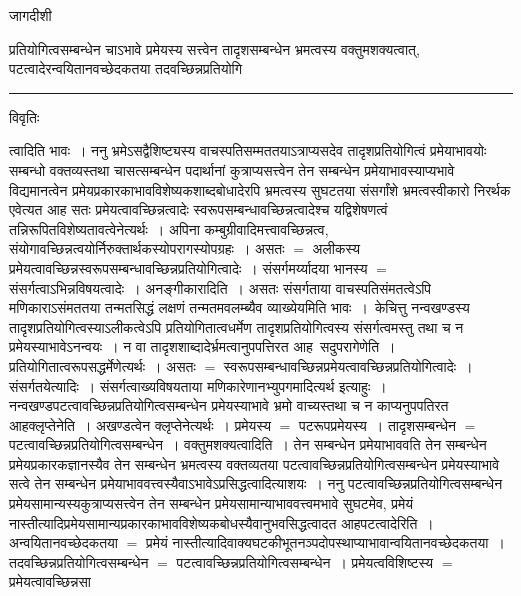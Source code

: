 \documentclass[10pt, openany]{book}
\begin{document}
{\newpage
\begin{center} जागदीशी \end{center}
{\la प्रतियोगित्वसम्बन्धेन चाऽभावे प्रमेयस्य सत्त्वेन तादृशसम्बन्धेन भ्रमत्वस्य वक्तुमशक्यत्वात्, पटत्वादेरन्वयितानवच्छेदकतया तदवच्छिन्नप्रतियोगि\textendash}\\
\hrule
\begin{center}     विवृतिः \end{center}
त्वादिति भावः~। ननु भ्रमेऽसद्वैशिष्ट्यस्य वाचस्पतिसम्मततयाऽत्राप्यसदेव तादृशप्रतियोगित्वं प्रमेयाभावयोः सम्बन्धो वक्तव्यस्तथा चासत्सम्बन्धेन पदार्थानां कुत्राप्यसत्त्वेन तेन सम्बन्धेन प्रमेयाभावस्याप्यभावे विद्यमानत्वेन प्रमेयप्रकारकाभावविशेष्यकशाब्दबोधादेरपि भ्रमत्वस्य सुघटतया संसर्गांशे भ्रमत्वस्वीकारो निरर्थक एवेत्यत आह सतः प्रमेयत्वावच्छिन्नत्वादेः स्वरूपसम्बन्धावच्छिन्नत्वादेश्च यद्विशेषणत्वं तन्निरूपितविशेष्यतावत्वेनेत्यर्थः~। अपिना कम्बुग्रीवादिमत्त्वावच्छिन्नत्व,
संयोगावच्छिन्नत्वयोर्निरुक्तार्थकस्योपरागस्योपग्रहः~। असतः $=$ अलीकस्य प्रमेयत्वावच्छिन्नस्वरूपसम्बन्धावच्छिन्नप्रतियोगित्वादेः~। संसर्गमर्य्यादया भानस्य $=$ संसर्गत्वाऽभिन्नविषयत्वादेः~। अनङ्गीकारादिति~। असतः संसर्गताया वाचस्पतिसंमतत्वेऽपि मणिकाराऽसंमततया तन्मतसिद्धं लक्षणं तन्मतमवलम्ब्यैव व्याख्येयमिति भावः~।~{\la केचित्तु} नन्वखण्डस्य तादृशप्रतियोगित्वस्याऽलीकत्वेऽपि प्रतियोगितात्वधर्मेण तादृशप्रतियोगित्वस्य संसर्गत्वमस्तु तथा च न प्रमेयस्याभावेऽनन्वयः~। न वा तादृशशाब्दादेर्भ्रमत्वानुपपत्तिरत आह\textemdash\ {\la सदुपरागेणेति~।} प्रतियोगितात्वरूपसद्धर्मेणेत्यर्थः~। असतः $=$ स्वरूपसम्बन्धावच्छिन्नप्रमेयत्वावच्छिन्नप्रतियोगित्वादेः~।
संसर्गतयेत्यादिः~। संसर्गत्वाख्यविषयताया मणिकारेणानभ्युपगमादित्यर्थ इत्याहुः~।
नन्वखण्डपटत्वावच्छिन्नप्रतियोगित्वसम्बन्धेन प्रमेयस्याभावे भ्रमो
वाच्यस्तथा च
न काप्यनुपपतिरत आह\textendash क्लृप्{\la तेनेति~।} अखण्डत्वेन क्लृप्तेनेत्यर्थः~। प्रमेयस्य  $=$ पटरूपप्रमेयस्य~। तादृशसम्बन्धेन $=$ पटत्वावच्छिन्नप्रतियोगित्वसम्बन्धेन~। वक्तुमशक्यत्वादिति~। तेन सम्बन्धेन प्रमेयाभाववति तेन सम्बन्धेन प्रमेयप्रकारकज्ञानस्यैव तेन सम्बन्धेन भ्रमत्वस्य वक्तव्यतया
पटत्वावच्छिन्नप्रतियोगित्वसम्बन्धेन प्रमेयस्याभावे सत्वे तेन सम्बन्धेन प्रमेयाभाववत्त्वस्यैवाऽभावेऽप्रसिद्धत्वादित्याशयः~। ननु पटत्वावच्छिन्नप्रतियोगित्वसम्बन्धेन
प्रमेयसामान्यस्यकुत्राप्यसत्त्वेन तेन सम्बन्धेन प्रमेयसामान्याभाववत्त्वमभावे सुघटमेव, प्रमेयं नास्तीत्यादिप्रमेयसामान्यप्रकारकाभावविशेष्यकबोधस्यैवानुभवसिद्धत्वादत आह\textendash  पटत्वादेरिति~। अन्वयितानवच्छेदकतया $=$ प्रमेयं नास्तीत्यादिवाक्यघटकीभूतनञ्पदोपस्थाप्याभावान्वयितानवच्छेदकतया~।तदवच्छिन्नप्रतियोगित्वसम्बन्धेन $=$ पटत्वावच्छिन्नप्रतियोगित्वसम्बन्धेन~। प्रमेयत्वविशिष्टस्य $=$ प्रमेयत्वावच्छिन्नसा
}
\end{document}
